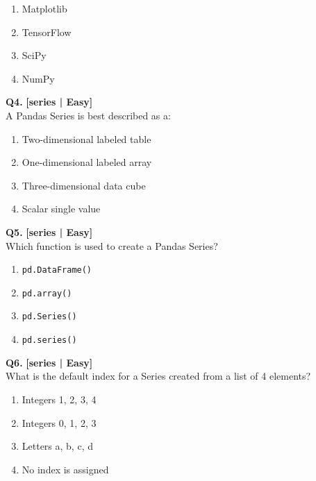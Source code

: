 \begin{enumerate}[label=(\alph*),topsep=2pt,itemsep=1pt,partopsep=0pt,parsep=0pt]
    \item \relax Matplotlib
    \item \relax TensorFlow
    \item \relax SciPy
    \item \relax NumPy
\end{enumerate}
\vspace{2mm}

\noindent\textbf{Q4.} \hfill {\small\color{LPUOrange}\textbf{[series | Easy]}}\\[2pt]
A Pandas Series is best described as a:

\begin{enumerate}[label=(\alph*),topsep=2pt,itemsep=1pt,partopsep=0pt,parsep=0pt]
    \item \relax Two-dimensional labeled table
    \item \relax One-dimensional labeled array
    \item \relax Three-dimensional data cube
    \item \relax Scalar single value
\end{enumerate}
\vspace{2mm}

\noindent\textbf{Q5.} \hfill {\small\color{LPUOrange}\textbf{[series | Easy]}}\\[2pt]
Which function is used to create a Pandas Series?

\begin{enumerate}[label=(\alph*),topsep=2pt,itemsep=1pt,partopsep=0pt,parsep=0pt]
    \item \relax \texttt{pd.DataFrame()}
    \item \relax \texttt{pd.array()}
    \item \relax \texttt{pd.Series()}
    \item \relax \texttt{pd.series()}
\end{enumerate}
\vspace{2mm}

\noindent\textbf{Q6.} \hfill {\small\color{LPUOrange}\textbf{[series | Easy]}}\\[2pt]
What is the default index for a Series created from a list of 4 elements?

\begin{enumerate}[label=(\alph*),topsep=2pt,itemsep=1pt,partopsep=0pt,parsep=0pt]
    \item \relax Integers 1, 2, 3, 4
    \item \relax Integers 0, 1, 2, 3
    \item \relax Letters a, b, c, d
    \item \relax No index is assigned
\end{enumerate}
\vspace{2mm}

